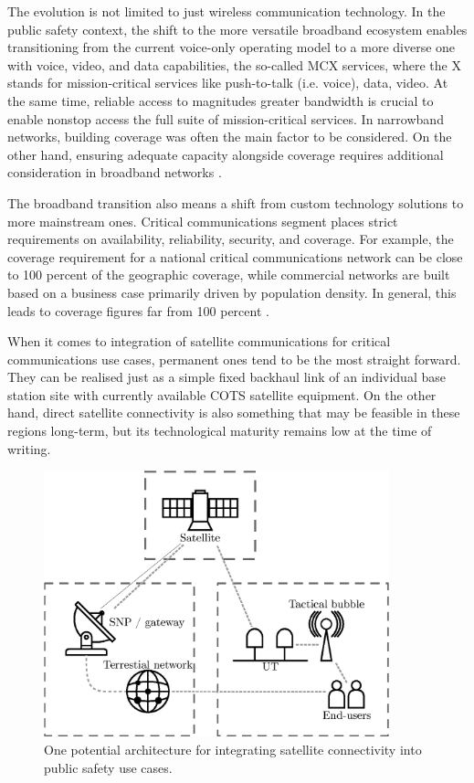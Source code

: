 \documentclass[english, 12pt, a4paper, elec, utf8, a-1b, online]{aaltothesis}
\begin{document}
The evolution is not limited to just wireless communication technology. In the public safety context, the shift to the more versatile broadband ecosystem enables transitioning from the current voice-only operating model to a more diverse one with voice, video, and data capabilities, the so-called MCX services, where the X stands for mission-critical services like push-to-talk (i.e. voice), data, video.
At the same time, reliable access to magnitudes greater bandwidth is crucial to enable nonstop access the full suite of mission-critical services.
In narrowband networks, building coverage was often the main factor to be considered.
On the other hand, ensuring adequate capacity alongside coverage requires additional consideration in broadband networks \cite{saynevirta2021satellite}.

The broadband transition also means a shift from custom technology solutions to more mainstream ones. Critical communications segment places strict requirements on availability, reliability, security, and coverage. For example, the coverage requirement for a national critical communications network can be close to 100 percent of the geographic coverage, while commercial networks are built based on a business case primarily driven by population density. In general, this leads to coverage figures far from 100 percent \cite{saynevirta2021satellite}.

When it comes to integration of satellite communications for critical communications use cases, permanent ones tend to be the most straight forward. They can be realised just as a simple fixed backhaul link of an individual base station site with currently available COTS satellite equipment.
On the other hand, direct satellite connectivity is also something that may be feasible in these regions long-term, but its technological maturity remains low at the time of writing.

\begin{figure}[h]
  \centering
  \includegraphics[width=100mm]{figures/fig-satcom-in-ps.eps}
  \caption{One potential architecture for integrating satellite connectivity into public safety use cases.}
  \label{fig-satcom-in-ps}
\end{figure}
\end{document}

